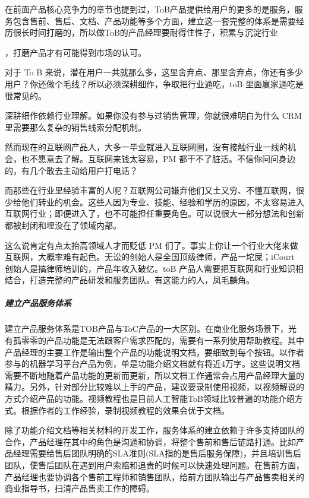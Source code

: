 \documentclass[letterpaper,10pt,english]{sphinxmanual}
\begin{document}
在前面产品核心竞争力的章节也提到过，ToB产品提供给用户的更多的是服务，服务包含售前、售后、文档、产品功能等多个方面，建立这一套完整的体系是需要经历很长时间打磨的，所以做ToB的产品经理要耐得住性子，积累与沉淀行业%
\begin{footnote}[82]\sphinxAtStartFootnote
{}
%
\end{footnote}，打磨产品才有可能得到市场的认可。

对于 To B
来说，潜在用户一共就那么多，这里舍弃点、那里舍弃点，你还有多少用户？你还做个毛线？所以必须深耕细作，争取把行业通吃，toB
里面赢家通吃是很常见的。

深耕细作依赖行业理解。如果你没有参与过销售管理，你就很难明白为什么 CRM
里需要那么复杂的销售线索分配机制。

然而现在的互联网产品人，大多一毕业就进入互联网圈，没有接触行业一线的机会，也不愿意去了解。互联网来钱太容易，PM
都干不了脏活。不信你问问身边的，有几个敢去主动给用户打电话？

而那些在行业里经验丰富的人呢？互联网公司嫌弃他们又土又穷、不懂互联网，很少给他们转业的机会。这些人因为专业、技能、经验和学历的原因，不太容易进入互联网行业；即便进入了，也不可能担任重要角色。可以说很大一部分想法和创新都被封闭和埋没在了领域内部。

这么说肯定有点太抬高领域人才而贬低 PM
们了。事实上你让一个行业大佬来做互联网，大概率难有起色。无讼的创始人是全国顶级律师，产品一坨屎；iCourt
创始人是搞律师培训的，产品年收入破亿。toB
产品人需要把互联网和行业知识相结合，打造完整的产品研发和服务团队。有这能力的人，凤毛麟角。


\subparagraph{建立产品服务体系}
\label{\detokenize{chapter_introduction/2B:id20}}
建立产品服务体系是TOB产品与ToC产品的一大区别。在商业化服务场景下，光有孤零零的产品功能是无法跟客户需求匹配的，需要有一系列使用帮助教程。其中产品经理的主要工作是输出整个产品的功能说明文档，要细致到每个按钮。以作者参与的机器学习平台产品为例，单是功能介绍文档就有将近4万字。这些说明文档需要不断地随着产品功能的更新而更新，所以文档工作通常会占用产品经理大量的精力。另外，针对部分比较难以上手的产品，建议要录制使用视频，以视频解说的方式介绍产品的功能。视频教程也是目前人工智能ToB领域比较普遍的功能介绍方式。根据作者的工作经验，录制视频教程的效果会优于文档。

除了功能介绍文档等相关材料的开发工作，服务体系的建立依赖于许多支持团队的合作，产品经理在其中的角色是沟通和协调，将整个售前和售后链路打通。比如产品经理需要给售后团队明确的SLA准则(SLA指的是售后服务保障)，并且培训售后团队，使售后团队在遇到用户索赔和追责的时候可以快速处理问题。在售前方面，产品经理也要协调各个售前工程师和销售团队，给前方团队输出与产品售卖相关的商业指导书，扫清产品售卖工作的障碍。
\end{document}
